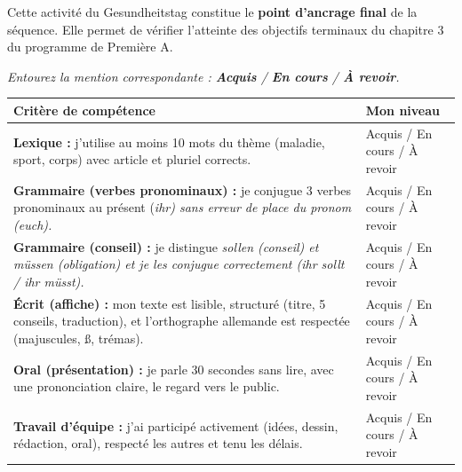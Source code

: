 \documentclass[11pt]{article}
\newcommand{\cle}[1]{{\popxbold\color{popdark}#1}}
\newcounter{popsec}
\newcounter{popsub}
\newcommand{\courssub}[1]{%
  \stepcounter{popsub}%
  \par\vspace{9pt}\noindent{\popxbold\fontsize{11.5}{13}\selectfont\color{popink}{\color{poporange}\thepopsec.\thepopsub}\hspace{6pt}#1}\par\nopagebreak\vspace{4pt}
}
\newcommand{\all}[1]{\ifmmode\text{\textit{#1}}\else\begingroup\selectlanguage{ngerman}\itshape #1\endgroup\fi}
\begin{document}
\courssub{Bilan de l'activité}
Cette activité du \cle{Gesundheitstag} constitue le \textbf{point d'ancrage final} de la séquence. Elle permet de vérifier l'atteinte des objectifs terminaux du chapitre 3 du programme de Première A.

\begin{experience}
\emph{Entourez la mention correspondante : \textbf{Acquis} / \textbf{En cours} / \textbf{À revoir}.}
\begin{center}
\begin{tabularx}{\linewidth}{|X|l|}
\hline
\rowcolor{popgreenL} \textbf{Critère de compétence} & \textbf{Mon niveau} \\ \hline
\textbf{Lexique :} j'utilise au moins 10 mots du thème (maladie, sport, corps) avec article et pluriel corrects. & Acquis / En cours / À revoir \\ \hline
\textbf{Grammaire (verbes pronominaux) :} je conjugue 3 verbes pronominaux au présent (\all{ihr}) sans erreur de place du pronom (\all{euch}). & Acquis / En cours / À revoir \\ \hline
\textbf{Grammaire (conseil) :} je distingue \all{sollen} (conseil) et \all{müssen} (obligation) et je les conjugue correctement (\all{ihr sollt / ihr müsst}). & Acquis / En cours / À revoir \\ \hline
\textbf{Écrit (affiche) :} mon texte est lisible, structuré (titre, 5 conseils, traduction), et l'orthographe allemande est respectée (majuscules, ß, trémas). & Acquis / En cours / À revoir \\ \hline
\textbf{Oral (présentation) :} je parle 30 secondes sans lire, avec une prononciation claire, le regard vers le public. & Acquis / En cours / À revoir \\ \hline
\textbf{Travail d'équipe :} j'ai participé activement (idées, dessin, rédaction, oral), respecté les autres et tenu les délais. & Acquis / En cours / À revoir \\ \hline
\end{tabularx}
\end{center}
\end{experience}
\end{document}
